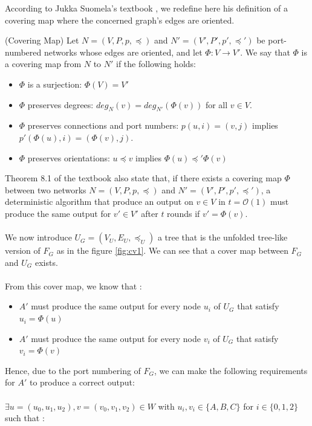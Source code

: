 According to Jukka Suomela's textbook \cite{textbook}, we redefine here his definition of a covering map where the concerned graph's edges are oriented.
\begin{defi}
(Covering Map) Let $N = (V,P,p, \preceq)$ and $N' = (V',P',p',\preceq')$ be port-numbered networks whose edges are oriented, and let $\Phi: V \rightarrow V'$. We say that $\Phi$ is a covering map from $N$ to $N'$ if the following holds:
\begin{itemize}
    \item $\Phi$ is a surjection: $\Phi(V) = V'$
    \item $\Phi$ preserves degrees: $deg_N(v) = deg_{N'}(\Phi(v))$ for all $v \in V$.
    \item $\Phi$ preserves connections and port numbers: $p(u,i) = (v,j)$ implies
    $p'(\Phi(u), i) = (\Phi(v), j)$.
    \item $\Phi$ preserves orientations: $u \preceq v$ implies  $\Phi(u) \preceq' \Phi(v)$
\end{itemize}
\end{defi}
Theorem 8.1 of the textbook \cite[p.127]{textbook} also state that, if there exists a covering map $\Phi$ between two networks $N = (V,P,p, \preceq)$ and $N' = (V',P',p',\preceq')$, a deterministic algorithm that produce an output on $v \in V$ in $t=\mathcal{O}(1)$ must produce the same output for $v'\in V'$ after $t$ rounds if $v' = \Phi(v)$.\\\\
We now introduce $U_G = (V_U, E_U,\preceq_U)$ a tree that is the unfolded tree-like version of $F_G$ \cite[p. 7]{linear_in_delta} as in the figure \ref{fig:cv1}. We can see that a cover map between $F_G$ and $U_G$ exists.\\\\
 From this cover map, we know that :
 \begin{itemize}
     \item $A'$ must produce the same output for every node $u_i$ of $U_G$ that satisfy $u_i = \Phi(u)$
     \item $A'$ must produce the same output for every node $v_i$ of $U_G$ that satisfy $v_i = \Phi(v)$
 \end{itemize}
Hence, due to the port numbering of $F_G$, we can make the following requirements for $A'$ to produce a correct output:\\\\
$\exists u = (u_0,u_1,u_2),v = (v_0,v_1,v_2) \in W $ with $u_i,v_i\in \{A,B,C\}$ for $i\in \{0,1,2\}$ such that :
